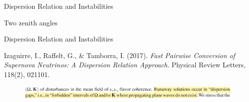 \documentclass[9pt]{beamer}
\begin{document}
\begin{darkframes}
\begin{frame}{Dispersion Relation and Instabilities}


\begin{tcolorbox}
   \centering
   Two zenith angles
\end{tcolorbox}

\end{frame}

\begin{frame}{Dispersion Relation and Instabilities}

   \begin{tcolorbox}[standard jigsaw,opacityback=0]
      \color{white}
      \small
      Izaguirre, I., Raffelt, G., \& Tamborra, I. (2017). \emph{Fast Pairwise Conversion of Supernova Neutrinos: A Dispersion Relation Approach}. Physical Review Letters, 118(2), 021101.
   \end{tcolorbox}
\vspace{-0.7em}
   \begin{tcolorbox}
\begin{figure}
   \includegraphics[width=\textwidth]{assets/dr/izaguirre1.jpg}
\end{figure}


\end{tcolorbox}
\end{frame}
\end{darkframes}
\end{document}
